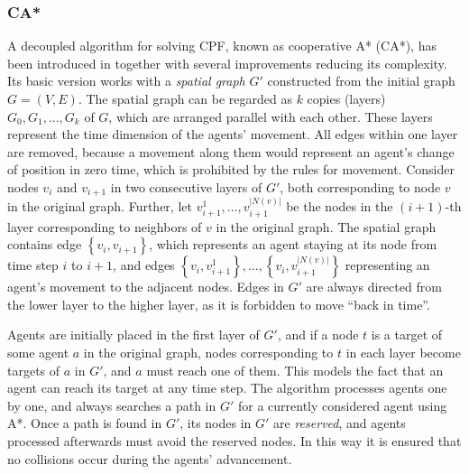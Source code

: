 \subsubsection{CA*}

A decoupled algorithm for solving CPF, known as cooperative A* (CA*), has been introduced in \cite{silver05} together with several improvements reducing its complexity.
Its basic version works with a \emph{spatial graph} $G'$ constructed from the initial graph $G=(V, E)$.
The spatial graph can be regarded as $k$ copies (layers) $G_0, G_1,\dots,G_k$ of $G$, which are arranged parallel with each other.
These layers represent the time dimension of the agents' movement.
All edges within one layer are removed, because a movement along them would represent an agent's change of position in zero time, which is prohibited by the rules for movement.
Consider nodes $v_i$ and $v_{i+1}$ in two consecutive layers of $G'$, both corresponding to node $v$ in the original graph.
Further, let $v_{i+1}^1,\dots,v_{i+1}^{|N(v)|}$ be the nodes in the $(i+1)$-th layer corresponding to neighbors of $v$ in the original graph.
The spatial graph contains edge $\left\{v_i,v_{i+1}\right\}$, which represents an agent staying at its node from time step $i$ to $i+1$, 
and edges $\left\{v_i,v_{i+1}^{1}\right\},\dots,\left\{v_i,v_{i+1}^{|N(v)|}\right\}$ representing an agent's movement to the adjacent nodes.
Edges in $G'$ are always directed from the lower layer to the higher layer, as it is forbidden to move ``back in time''.

Agents are initially placed in the first layer of $G'$, and if a node $t$ is a target of some agent $a$ in the original graph, nodes corresponding to $t$ in each layer become targets of $a$ in $G'$,
and $a$ must reach one of them.
This models the fact that an agent can reach its target at any time step.
The algorithm processes agents one by one, and always searches a path in $G'$ for a currently considered agent using A*.
Once a path is found in $G'$, its nodes in $G'$ are \emph{reserved}, and agents processed afterwards must avoid the reserved nodes.
In this way it is ensured that no collisions occur during the agents' advancement.

